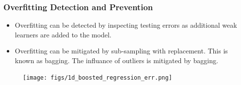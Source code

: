 \documentclass[t, pdftex]{beamer}
\begin{document}
\begin{frame}[shrink=10]
\frametitle{Overfitting Detection and Prevention}
\begin{itemize}
\item Overfitting can be detected by inspecting testing errors as additional weak learners are added to the model.
\item Overfitting can be mitigated by sub-sampling with replacement.  This is known as bagging.  The influance of outliers is mitigated by bagging.
\end{itemize}
\begin{figure}[!htbp]
\centering
\texttt{[image: figs/1d\_boosted\_regression\_err.png]}
\label{model_overview}
\end{figure}
\end{frame}
\end{document}
